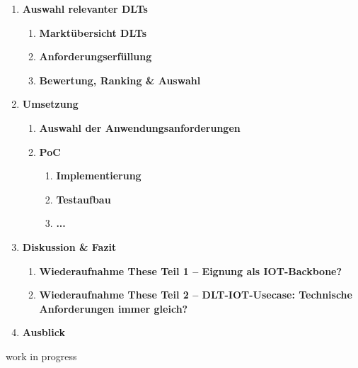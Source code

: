 \documentclass[
    ngerman,american
    ]{scrartcl}
\newcommand{\lang}{de}
\begin{document}
\begin{enumerate}
            \item \textbf{Auswahl relevanter DLTs}
                    \begin{enumerate}
                        \item \textbf{Marktübersicht DLTs}
                        \item \textbf{Anforderungserfüllung}
                        \item \textbf{Bewertung, Ranking \& Auswahl}
                    \end{enumerate}
            \item \textbf{Umsetzung}
                    \begin{enumerate}
                        \item \textbf{Auswahl der Anwendungsanforderungen}
                        \item \textbf{PoC}
				\begin{enumerate}
                        		\item \textbf{Implementierung}
                        		\item \textbf{Testaufbau}
                        		\item \textbf{...}
                    		\end{enumerate}
                    \end{enumerate}
            \item \textbf{Diskussion \& Fazit}
                    \begin{enumerate}
                        \item \textbf{Wiederaufnahme These Teil 1 – Eignung als IOT-Backbone?}
                        \item \textbf{Wiederaufnahme These Teil 2 – DLT-IOT-Usecase: Technische Anforderungen immer gleich?}
                    \end{enumerate}
            \item \textbf{Ausblick}
        \end{enumerate}

        \newpage

        \sectionSource{\lang}
        \sectionSourceDescription{\lang}

        \begin{description}
          \item[work in progress]
        \end{description}

        \newpage

      \printbibliography
    
\end{document}
